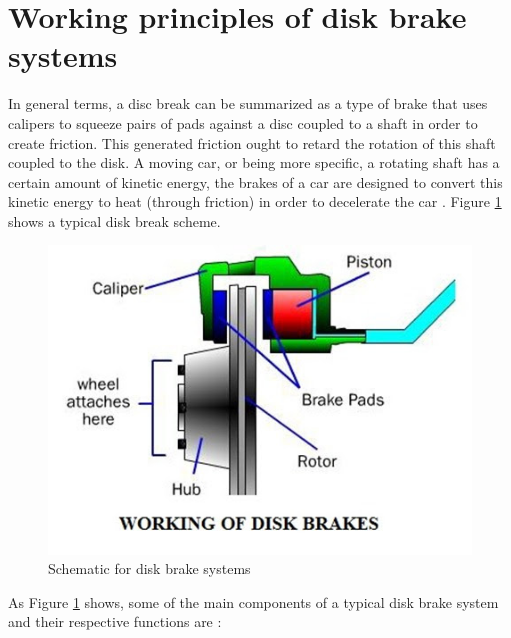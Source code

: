 \section{Working principles of disk brake systems}\label{sec:working-principles-of-disk-brake-systems}

		In general terms, a disc break can be summarized as a type of brake that uses calipers to squeeze pairs of pads against a disc coupled to a shaft in order to create friction. This generated friction ought to retard the rotation of this shaft coupled to the disk. A moving car, or being more specific, a rotating shaft has a certain amount of kinetic energy, the brakes of a car are designed to convert this kinetic energy to heat (through friction) in order to decelerate the car \cite{limpert1999brake}. Figure \ref{fig:working-of-disk-breaks} shows a typical disk break scheme.

		\begin{figure}[htbp]
			\centering
				\includegraphics[width=.8\textwidth]{figuras/fig-disk_brake_working}
			\caption{Schematic for disk brake systems \cite{fig-working-of-disk-breaks}}
			\label{fig:working-of-disk-breaks}
		\end{figure}

		As Figure \ref{fig:working-of-disk-breaks} shows, some of the main components of a typical disk brake system and their respective functions are \cite{carparts-brake}:

